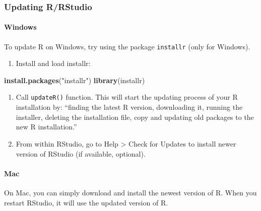 \documentclass[
]{article}
\newenvironment{Shaded}{\begin{snugshade}}{\end{snugshade}}
\newcommand{\KeywordTok}[1]{\textcolor[rgb]{0.13,0.29,0.53}{\textbf{#1}}}
\newcommand{\NormalTok}[1]{#1}
\newcommand{\StringTok}[1]{\textcolor[rgb]{0.31,0.60,0.02}{#1}}
\providecommand{\tightlist}{%
  \setlength{\itemsep}{0pt}\setlength{\parskip}{0pt}}
\begin{document}
\hypertarget{updating-rrstudio}{%
\subsubsection{Updating R/RStudio}\label{updating-rrstudio}}

\hypertarget{windows-1}{%
\paragraph{Windows}\label{windows-1}}

To update R on Windows, try using the package \texttt{installr} (only
for Windows).

\begin{enumerate}
\def\labelenumi{\arabic{enumi}.}
\tightlist
\item
  Install and load installr:
\end{enumerate}

\begin{Shaded}
\begin{Highlighting}[]
\KeywordTok{install.packages}\NormalTok{(}\StringTok{"installr"}\NormalTok{)}
\KeywordTok{library}\NormalTok{(installr)}
\end{Highlighting}
\end{Shaded}

\begin{enumerate}
\def\labelenumi{\arabic{enumi}.}
\setcounter{enumi}{1}
\tightlist
\item
  Call \texttt{updateR()} function. This will start the updating process
  of your R installation by: ``finding the latest R version, downloading
  it, running the installer, deleting the installation file, copy and
  updating old packages to the new R installation.''\\
\item
  From within RStudio, go to Help \textgreater{} Check for Updates to
  install newer version of RStudio (if available, optional).
\end{enumerate}

\hypertarget{mac-1}{%
\paragraph{Mac}\label{mac-1}}

On Mac, you can simply download and install the newest version of R.
When you restart RStudio, it will use the updated version of R.
\end{document}
